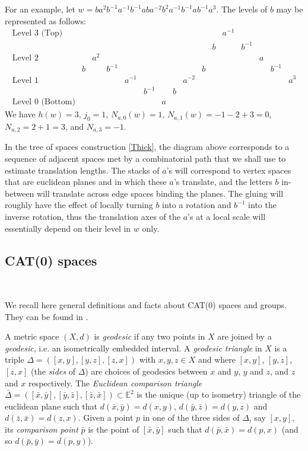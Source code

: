 \documentclass  [a4paper, 11pts] {article}
\begin{document}
For an example, let $w = ba^2b^{-1}a^{-1}b^{-1}aba^{-2}b^2a^{-1}b^{-1}ab^{-1}a^3$. The levels of $b$ may be represented as follows:
\[\begin{array}{rccccccccccccccc}
\text{Level } 3 \text{ (Top)} & & & & & & & & & & & a^{-1} \\
& & & & & & & & & & b & & b^{-1} & \\
\text{Level } 2 &  & a^2 & & & & & & & & & & & a & \\
& b &  & b^{-1} & & & & & & b & & & & & b^{-1} \\
\text{Level } 1 &  & & & a^{-1} & & & & a^{-2} & & & & & & & a^3 \\
&  & & & & b^{-1} & & b & \\
\text{Level } 0 \text{ (Bottom)} &  & & & & & a &
\end{array}\]
We have $h(w) = 3$, $j_0 = 1$, $N_{a,0}(w) = 1$, $N_{a, 1}(w) = -1 - 2 + 3 = 0$, $N_{a, 2} = 2 + 1 = 3$, and $N_{a, 3} = -1$.

In the tree of spaces construction \ref{Thick}, the diagram above corresponds to a sequence of adjacent spaces met by a combinatorial path that we shall use to estimate translation lengths. The stacks of $a$'s will correspond to vertex spaces that are euclidean planes and in which these $a$'s translate, and the letters $b$ in-between will translate across edge spaces binding the planes. The gluing will roughly have the effect of locally turning $b$ into a rotation and $b^{-1}$ into the inverse rotation, thus the translation axes of the $a$'s at a local scale will essentially depend on their level in $w$ only.

\subsection{CAT(0) spaces} ~
\label{CAT0}

We recall here general definitions and facts about CAT(0) spaces and groups. They can be found in \cite{BH99}.

A metric space $(X, d)$ is \emph{geodesic} if any two points in $X$ are joined by a \emph{geodesic}, i.e. an isometrically embedded interval. A \emph{geodesic triangle} in $X$ is a triple $\Delta = ([x, y], [y, z], [z, x])$ with $x, y, z\in X$ and where $[x, y]$, $[y, z]$, $[z, x]$ (the \emph{sides} of $\Delta$) are choices of geodesics between $x$ and $y$, $y$ and $z$, and $z$ and $x$ respectively. The \emph{Euclidean comparison triangle} $\bar{\Delta} = ([\bar{x}, \bar{y}], [\bar{y}, \bar{z}], [\bar{z}, \bar{x}])\subset \mathbb{E}^2$ is the unique (up to isometry) triangle of the euclidean plane such that $d(\bar{x}, \bar{y}) = d(x, y)$, $d(\bar{y}, \bar{z}) = d(y, z)$ and $d(\bar{z}, \bar{x}) = d(z, x)$. Given a point $p$ in one of the three sides of $\Delta$, say $[x, y]$, its \emph{comparison point} $\bar{p}$ is the point of $[\bar{x}, \bar{y}]$ such that $d(\bar{p}, \bar{x}) = d(p, x)$ (and so $d(\bar{p}, \bar{y}) = d(p, y)$).
\end{document}
